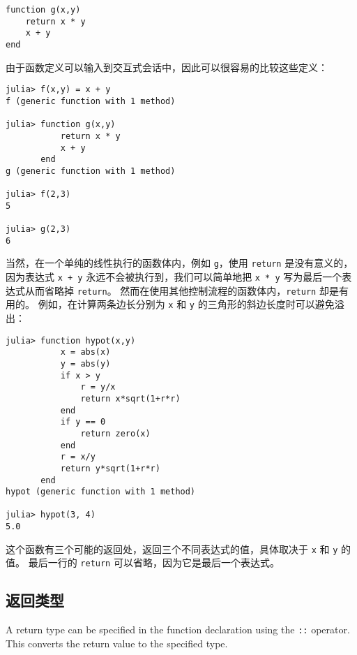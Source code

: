 \begin{verbatim}
function g(x,y)
    return x * y
    x + y
end
\end{verbatim}



由于函数定义可以输入到交互式会话中，因此可以很容易的比较这些定义：




\begin{verbatim}
julia> f(x,y) = x + y
f (generic function with 1 method)

julia> function g(x,y)
           return x * y
           x + y
       end
g (generic function with 1 method)

julia> f(2,3)
5

julia> g(2,3)
6
\end{verbatim}



当然，在一个单纯的线性执行的函数体内，例如 \texttt{g}，使用 \texttt{return} 是没有意义的，因为表达式 \texttt{x + y} 永远不会被执行到，我们可以简单地把 \texttt{x * y} 写为最后一个表达式从而省略掉 \texttt{return}。 然而在使用其他控制流程的函数体内，\texttt{return} 却是有用的。 例如，在计算两条边长分别为 \texttt{x} 和 \texttt{y} 的三角形的斜边长度时可以避免溢出：




\begin{verbatim}
julia> function hypot(x,y)
           x = abs(x)
           y = abs(y)
           if x > y
               r = y/x
               return x*sqrt(1+r*r)
           end
           if y == 0
               return zero(x)
           end
           r = x/y
           return y*sqrt(1+r*r)
       end
hypot (generic function with 1 method)

julia> hypot(3, 4)
5.0
\end{verbatim}



这个函数有三个可能的返回处，返回三个不同表达式的值，具体取决于 \texttt{x} 和 \texttt{y} 的值。 最后一行的 \texttt{return} 可以省略，因为它是最后一个表达式。



\hypertarget{3145756716608098346}{}


\subsection{返回类型}



A return type can be specified in the function declaration using the \texttt{::} operator. This converts the return value to the specified type.




